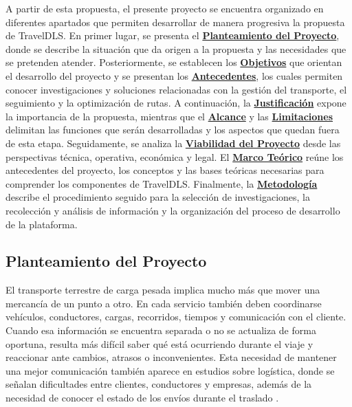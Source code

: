 A partir de esta propuesta, el presente proyecto se encuentra organizado en diferentes apartados que permiten desarrollar de manera progresiva la propuesta de TravelDLS. En primer lugar, se presenta el \textbf{\hyperref[sec:planteamiento]{Planteamiento del Proyecto}}, donde se describe la situación que da origen a la propuesta y las necesidades que se pretenden atender. Posteriormente, se establecen los \textbf{\hyperref[sec:objetivos]{Objetivos}} que orientan el desarrollo del proyecto y se presentan los \textbf{\hyperref[sec:antecedentes]{Antecedentes}}, los cuales permiten conocer investigaciones y soluciones relacionadas con la gestión del transporte, el seguimiento y la optimización de rutas. A continuación, la \textbf{\hyperref[sec:justificacion]{Justificación}} expone la importancia de la propuesta, mientras que el \textbf{\hyperref[sec:alcance]{Alcance}} y las \textbf{\hyperref[sec:limitaciones]{Limitaciones}} delimitan las funciones que serán desarrolladas y los aspectos que quedan fuera de esta etapa. Seguidamente, se analiza la \textbf{\hyperref[sec:viabilidad]{Viabilidad del Proyecto}} desde las perspectivas técnica, operativa, económica y legal. El \textbf{\hyperref[sec:marco-teorico]{Marco Teórico}} reúne los antecedentes del proyecto, los conceptos y las bases teóricas necesarias para comprender los componentes de TravelDLS. Finalmente, la \textbf{\hyperref[sec:metodologia]{Metodología}} describe el procedimiento seguido para la selección de investigaciones, la recolección y análisis de información y la organización del proceso de desarrollo de la plataforma.

\subsection{Planteamiento del Proyecto}
\label{sec:planteamiento}

El transporte terrestre de carga pesada implica mucho más que mover una mercancía de un punto a otro. En cada servicio también deben coordinarse vehículos, conductores, cargas, recorridos, tiempos y comunicación con el cliente. Cuando esa información se encuentra separada o no se actualiza de forma oportuna, resulta más difícil saber qué está ocurriendo durante el viaje y reaccionar ante cambios, atrasos o inconvenientes. Esta necesidad de mantener una mejor comunicación también aparece en estudios sobre logística, donde se señalan dificultades entre clientes, conductores y empresas, además de la necesidad de conocer el estado de los envíos durante el traslado \parencite[p. 2]{sultan2022real}.

